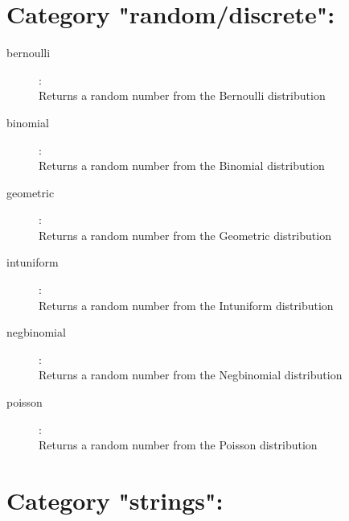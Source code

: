 \section{Category "random/discrete":}
\label{sec:ned-functions:category-random-discrete}

\begin{description}
\item[bernoulli]:  \\
    Returns a random number from the Bernoulli distribution
\item[binomial]:  \\
    Returns a random number from the Binomial distribution
\item[geometric]:  \\
    Returns a random number from the Geometric distribution
\item[intuniform]:  \\
    Returns a random number from the Intuniform distribution
\item[negbinomial]:  \\
    Returns a random number from the Negbinomial distribution
\item[poisson]:  \\
    Returns a random number from the Poisson distribution

\end{description}

\section{Category "strings":}
\label{sec:ned-functions:category-strings}

